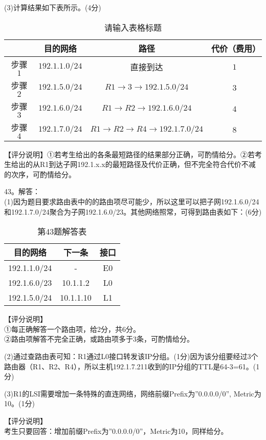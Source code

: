 (3)计算结果如下表所示。(4分) \\
\begin{table}[ht]
\centering
\caption{请输入表格标题}\label{CSN14_tab5}
\begin{tabular}{|c|c|c|c|}
\hline
 & 目的网络 & 路径 & 代价（费用）  \\
\hline
步骤 $1$ & $192.1.1.0/24$ & 直接到达 & $1$  \\
\hline
步骤 $2$ & $192.1.5.0/24$ & $R1 \rightarrow 3 \rightarrow 192.1.5.0/24$ & $3$  \\
\hline
步骤 $3$ & $192.1.6.0/24$ & $R1\rightarrow R2\rightarrow 192.1.6.0/24$ & $4$  \\
\hline
步骤 $4$ & $192.1.7.0/24$ & $R1 \rightarrow R2 \rightarrow R4 \rightarrow 192.1.7.0/24$ & $8$  \\
\hline
\end{tabular}
\end{table}
【评分说明】①若考生给出的各条最短路径的结果部分正确，可酌情给分。②若考生给出的从R1到达子网192.1.x.x的最短路径及代价正确，但不完全符合代价不减的次序，可酌情给分。

43。解答： \\
(1)因为题目要求路由表中的的路由项尽可能少，所以这里可以把子网192.1.6.0/24和192.1.7.0/24聚合为子网192.1.6.0/23。其他网络照常，可得到路由表如下：(6分)

\begin{table}[ht]
\centering
\caption{第43题解答表}\label{CSN14_tab6}
\begin{tabular}{|c|c|c|}
\hline
目的网络 & 下一条 & 接口 \\
\hline
192.1.1.0/24 & - & E0 \\
\hline
192.1.6.0/23 & 10.1.1.2 & L0 \\
\hline
192.1.5.0/24 & 10.1.1.10 & L1 \\
\hline
\end{tabular}
\end{table}
【评分说明】 \\
①每正确解答一个路由项，给2分，共6分。  \\
②路由项解答不完全正确，或路由项多于3条，可酌情给分。

(2)通过查路由表可知：R1通过L0接口转发该IP分组。(1分)因为该分组要经过3个路由器（R1、R2、R4），所以主机192.1.7.211收到的IP分组的TTL是64-3=61。(1分)

(3)R1的LSI需要增加一条特殊的直连网络，网络前缀Prefix为”0.0.0.0/0”, Metric为10。(1分)

【评分说明】 \\
考生只要回答：增加前缀Prefix为”0.0.0.0/0”，Metric为10，同样给分。

